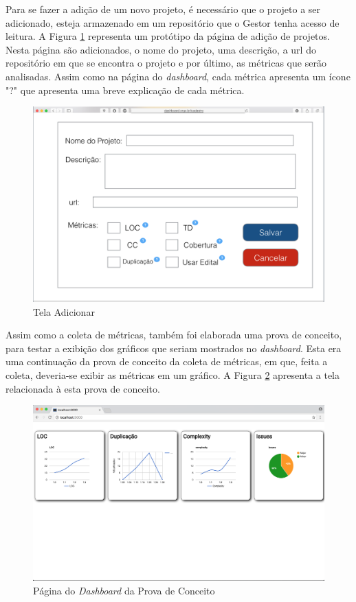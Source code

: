 Para se fazer a adição de um novo projeto, é necessário que o projeto a ser adicionado, esteja armazenado em um repositório que o Gestor tenha acesso de leitura. A Figura \ref{img:telaAdicionar} representa um protótipo da página de adição de projetos. Nesta página são adicionados, o nome do projeto, uma descrição, a url do repositório em que se encontra o projeto e por último, as métricas que serão analisadas. Assim como na página do \textit{dashboard}, cada métrica apresenta um ícone "?" que apresenta uma breve explicação de cada métrica.

\graphicspath{{figuras/}}
\begin{figure}
\centering
\includegraphics[scale=0.60]{telaAdicionar.png}
\caption{Tela Adicionar}
\label{img:telaAdicionar}
\end{figure} 

Assim como a coleta de métricas, também foi elaborada uma prova de conceito, para testar a exibição dos gráficos que seriam mostrados no \textit{dashboard}. Esta era uma continuação da prova de conceito da coleta de métricas, em que, feita a coleta, deveria-se exibir as métricas em um gráfico. A Figura \ref{img:dashboard} apresenta a tela relacionada à esta prova de conceito.

\graphicspath{{figuras/}}
\begin{figure}[H]
\centering
\includegraphics[scale=0.35]{dashboard_conceito.png}
\caption{Página do \textit{Dashboard} da Prova de Conceito}
\label{img:dashboard}
\end{figure}

